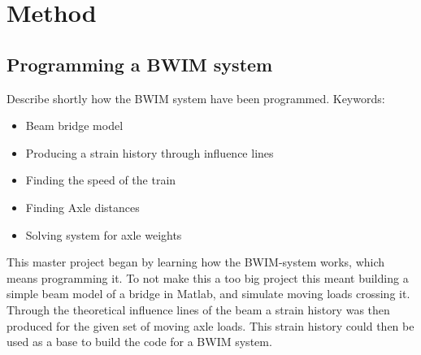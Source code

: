 \section{Method}

\subsection{Programming a BWIM system}
Describe shortly how the BWIM system have been programmed.
Keywords: 
\begin{itemize}
\item Beam bridge model
\item Producing a strain history through influence lines
\item Finding the speed of the train
\item Finding Axle distances
\item Solving system for axle weights
\end{itemize}

This master project began by learning how the BWIM-system works, which means programming it. To not make this a too big project this meant building a simple beam model of a bridge in Matlab, and simulate moving loads crossing it. Through the theoretical influence lines of the beam a strain history was then produced for the given set of moving axle loads. This strain history could then be used as a base to build the code for a BWIM system. 
\\


